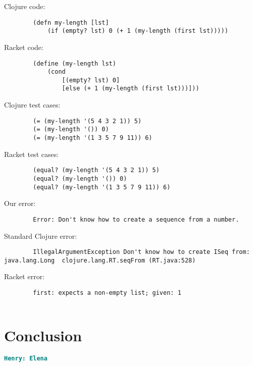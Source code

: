 \documentclass[12pt]{article}
\newcommand{\comment}[1]{{\bf \tt  {#1}}}
\newcommand{\hfcomment}[1]{\textcolor{Teal}{\comment{Henry: {#1}}}}
\begin{document}
		
	Clojure code:
\begin{verbatim}
		(defn my-length [lst]
 			(if (empty? lst) 0 (+ 1 (my-length (first lst)))))
\end{verbatim}
	Racket code:
\begin{verbatim}
		(define (my-length lst)
  			(cond
 				[(empty? lst) 0]
   				[else (+ 1 (my-length (first lst)))]))
\end{verbatim}
	Clojure test cases:
\begin{verbatim}
		(= (my-length '(5 4 3 2 1)) 5)
		(= (my-length '()) 0)
		(= (my-length '(1 3 5 7 9 11)) 6)
\end{verbatim}
	Racket test cases:
\begin{verbatim}
		(equal? (my-length '(5 4 3 2 1)) 5)
		(equal? (my-length '()) 0)
		(equal? (my-length '(1 3 5 7 9 11)) 6)
\end{verbatim}
	Our error:
\begin{verbatim}
		Error: Don't know how to create a sequence from a number.
\end{verbatim}
	Standard Clojure error:
\begin{verbatim}
		IllegalArgumentException Don't know how to create ISeq from: java.lang.Long  clojure.lang.RT.seqFrom (RT.java:528)

\end{verbatim}
	Racket error:
\begin{verbatim}
		first: expects a non-empty list; given: 1
		
\end{verbatim}


\section{Conclusion}\label{sec:conclusion}
	\hfcomment{Elena}




\end{document}
